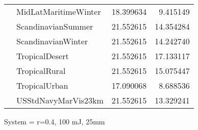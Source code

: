\begin{tabular}{llrr}
             & MidLatMaritimeWinter &  18.399634 &   9.415149 \\
             & ScandinavianSummer &  21.552615 &  14.354284 \\
             & ScandinavianWinter &  21.552615 &  14.242740 \\
             & TropicalDesert &  21.552615 &  17.133117 \\
             & TropicalRural &  21.552615 &  15.075447 \\
             & TropicalUrban &  17.090068 &   8.688536 \\
             & USStdNavyMarVis23km &  21.552615 &  13.329241 \\
\bottomrule
\end{tabular}


\clearpage
System = r=0.4, 100 mJ, 25mm

